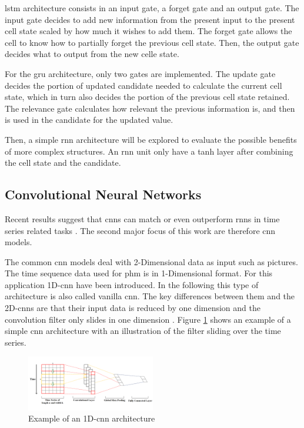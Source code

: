 \documentclass[conference]{IEEEtran}
\begin{document}
\gls{lstm} architecture consists in an input gate, a forget gate and an output gate. The input gate decides to add new information from the present input to the present cell state scaled by how much it wishes to add them. The forget gate allows the cell to know how to partially forget the previous cell state. Then, the output gate decides what to output from the new celle state.

For the \gls{gru} architecture, only two gates are implemented. The update gate decides the portion of updated candidate needed to calculate the current cell state, which in turn also decides the portion of the previous cell state retained. The relevance gate calculates how relevant the previous information is, and then is used in the candidate for the updated value.

Then, a simple \gls{rnn} architecture will be explored to evaluate the possible benefits of more complex structures. An \gls{rnn} unit only have a tanh layer after combining the cell state and the candidate.







\noindent
\subsection{Convolutional Neural Networks}

Recent results suggest that \glspl{cnn} can match or even outperform \glspl{rnn} in time series related tasks \cite{Bai2018}. The second major focus of this work are therefore \gls{cnn} models.

The common \gls{cnn} models deal with 2-Dimensional data as input such as pictures. The time sequence data used for \gls{phm} is in 1-Dimensional format. For this application 1D-\gls{cnn} have been introduced. In the following this type of architecture is also called vanilla \gls{cnn}. The key differences between them and the 2D-\glspl{cnn} are that their input data is reduced by one dimension and the convolution filter only slides in one dimension \cite{Akrim2021}. Figure \ref{fig:1D_cnn_architecture} shows an example of a simple \gls{cnn} architecture with an illustration of the filter sliding over the time series. 

\begin{figure}[htp]
	\centering
	\includegraphics[width=0.5\textwidth]{1D_CNN_Architecture.png}
	\caption{Example of an 1D-\gls{cnn} architecture \cite{Sayyad}}
	\label{fig:1D_cnn_architecture}
\end{figure}
\end{document}
